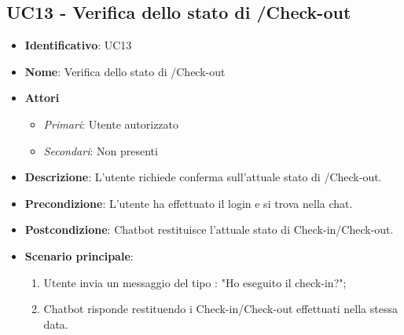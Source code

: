 \subsection{UC13 - Verifica dello stato di /Check-out}
\begin{itemize}
	\item \textbf{Identificativo}: UC13
	\item \textbf{Nome}: Verifica dello stato di /Check-out
	\item \textbf{Attori}
	\begin{itemize} 
		\item \textit{Primari}: Utente autorizzato
		\item \textit{Secondari}: Non presenti
	\end{itemize}
	\item \textbf{Descrizione}: L'utente richiede conferma sull'attuale stato di /Check-out.
	\item \textbf{Precondizione}: L'utente ha effettuato il login e si trova nella chat.
	\item \textbf{Postcondizione}: Chatbot restituisce l'attuale stato di Check-in/Check-out.
	\item \textbf{Scenario principale}:  \begin{enumerate}
		\item Utente invia un messaggio del tipo : "Ho eseguito il check-in?";
		\item Chatbot risponde restituendo i Check-in/Check-out effettuati nella stessa data.
	\end{enumerate}
\end{itemize}